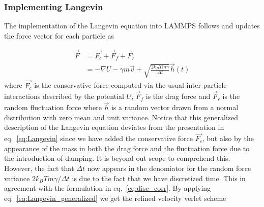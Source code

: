 \subsubsection{Implementing Langevin}






The implementation of the Langevin equation into LAMMPS follows
\cite{PhysRevB.17.1302} and updates the force vector for each particle as 

\begin{align}
  \vec{F} &= \vec{F_c} + \vec{F}_{f} + \vec{F}_{r} \nonumber \\
  &= -\nabla U - \gamma m \vec{v} + \sqrt{\frac{2 k_B T m \gamma}{\Delta t}}\vec{h}(t)
  \label{eq:Langevin_generalized}
\end{align}
where $\vec{F_c}$ is the conservative force computed via the usual
inter-particle interactions described by the potential $U$, $\vec{F}_f$ is the
drag force and $\vec{F}_r$ is the random fluctuation force where $\vec{h}$ is a
random vector drawn from a normal distribution with zero mean and unit variance.
Notice that this generalized description of the Langevin equation deviates from
the presentation in eq.~\eqref{eq:Langevin} since we have added the conservative
force $\vec{F_c}$, but also by the appearance of the mass in both the drag force
and the fluctuation force due to the introduction of damping. It is beyond out
scope to comprehend this. However, the fact that $\Delta t$ now appears in the
denomiator for the random force variance $2k_B T m \gamma / \Delta t$ is due to
the fact that we have discretized time. This in agreement with the formulation
in eq.~\eqref{eq:disc_corr}. By applying eq.~\eqref{eq:Langevin_generalized} we
get the refined velocity verlet scheme


